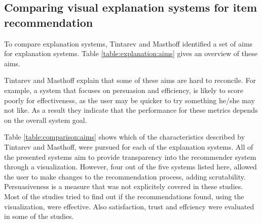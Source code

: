 \subsection{Comparing visual explanation systems for item recommendation}


To compare explanation systems, Tintarev and Masthoff \cite{tintarev:2007:SER:1547550.1547664} identified a set of aims for explanation systems. Table \ref{table:explanation:aims} gives an overview of these aims.

Tintarev and Masthoff explain that some of these aims are hard to reconcile. For example, a system that focuses on persuasion and efficiency, is likely to score poorly for effectiveness, as the user may be quicker to try something he/she may not like. As a result they indicate that the performance for these metrics depends on the overall system goal\cite{tintarev:2007:SER:1547550.1547664}.

Table \ref{table:comparison:aims} shows which of the characteristics described by Tintarev and Masthoff, were pursued for each of the explanation systems. All of the presented systems aim to provide transparency into the recommender system through a visualization. However, four out of the five systems listed here, allowed the user to make changes to the recommendation process, adding scrutability. Persuasiveness is a measure that was not explicitely covered in these studies. Most of the studies tried to find out if the recommendations found, using the visualization, were effective. Also satisfaction, trust and effciency were evaluated in some of the studies.

